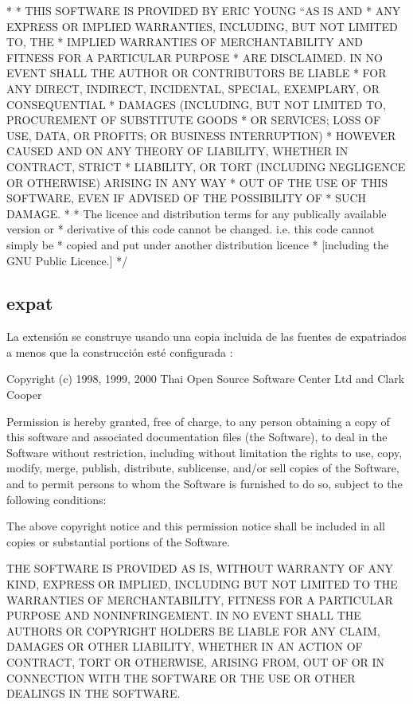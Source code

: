 \documentclass[a4,10pt,spanish]{sphinxmanual}
\begin{document}
\begin{sphinxVerbatim}[commandchars=\\\{\}]
    *
    * THIS SOFTWARE IS PROVIDED BY ERIC YOUNG ``AS IS\PYGZsq{}\PYGZsq{} AND
    * ANY EXPRESS OR IMPLIED WARRANTIES, INCLUDING, BUT NOT LIMITED TO, THE
    * IMPLIED WARRANTIES OF MERCHANTABILITY AND FITNESS FOR A PARTICULAR PURPOSE
    * ARE DISCLAIMED.  IN NO EVENT SHALL THE AUTHOR OR CONTRIBUTORS BE LIABLE
    * FOR ANY DIRECT, INDIRECT, INCIDENTAL, SPECIAL, EXEMPLARY, OR CONSEQUENTIAL
    * DAMAGES (INCLUDING, BUT NOT LIMITED TO, PROCUREMENT OF SUBSTITUTE GOODS
    * OR SERVICES; LOSS OF USE, DATA, OR PROFITS; OR BUSINESS INTERRUPTION)
    * HOWEVER CAUSED AND ON ANY THEORY OF LIABILITY, WHETHER IN CONTRACT, STRICT
    * LIABILITY, OR TORT (INCLUDING NEGLIGENCE OR OTHERWISE) ARISING IN ANY WAY
    * OUT OF THE USE OF THIS SOFTWARE, EVEN IF ADVISED OF THE POSSIBILITY OF
    * SUCH DAMAGE.
    *
    * The licence and distribution terms for any publically available version or
    * derivative of this code cannot be changed.  i.e. this code cannot simply be
    * copied and put under another distribution licence
    * [including the GNU Public Licence.]
    */
\end{sphinxVerbatim}


\subsection{expat}
\label{\detokenize{license:expat}}
\sphinxAtStartPar
La extensión  se construye usando una copia incluida de las fuentes de expatriados a menos que la construcción esté configurada :

\begin{sphinxVerbatim}[commandchars=\\\{\}]
Copyright (c) 1998, 1999, 2000 Thai Open Source Software Center Ltd
                               and Clark Cooper

Permission is hereby granted, free of charge, to any person obtaining
a copy of this software and associated documentation files (the
\PYGZdq{}Software\PYGZdq{}), to deal in the Software without restriction, including
without limitation the rights to use, copy, modify, merge, publish,
distribute, sublicense, and/or sell copies of the Software, and to
permit persons to whom the Software is furnished to do so, subject to
the following conditions:

The above copyright notice and this permission notice shall be included
in all copies or substantial portions of the Software.

THE SOFTWARE IS PROVIDED \PYGZdq{}AS IS\PYGZdq{}, WITHOUT WARRANTY OF ANY KIND,
EXPRESS OR IMPLIED, INCLUDING BUT NOT LIMITED TO THE WARRANTIES OF
MERCHANTABILITY, FITNESS FOR A PARTICULAR PURPOSE AND NONINFRINGEMENT.
IN NO EVENT SHALL THE AUTHORS OR COPYRIGHT HOLDERS BE LIABLE FOR ANY
CLAIM, DAMAGES OR OTHER LIABILITY, WHETHER IN AN ACTION OF CONTRACT,
TORT OR OTHERWISE, ARISING FROM, OUT OF OR IN CONNECTION WITH THE
SOFTWARE OR THE USE OR OTHER DEALINGS IN THE SOFTWARE.
\end{sphinxVerbatim}
\end{document}
